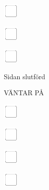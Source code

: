 \documentclass[11pt,titlepage]{article}
\begin{document}
\vspace{10mm}

\noindent
\includegraphics[]{checkbox-4mm.pdf}

\vspace{10mm}

\noindent
\includegraphics[]{checkbox-4mm.pdf}

\vspace{10mm}

\noindent
\includegraphics[]{checkbox-4mm.pdf}

\vspace{4mm}

\hfill Sidan slutförd \hspace{20mm}

\pagebreak

\small
\hfill VÄNTAR PÅ

\vspace{6mm}

\noindent
\includegraphics[]{checkbox-4mm.pdf}

\vspace{10mm}

\noindent
\includegraphics[]{checkbox-4mm.pdf}

\vspace{10mm}

\noindent
\includegraphics[]{checkbox-4mm.pdf}

\vspace{10mm}

\noindent
\includegraphics[]{checkbox-4mm.pdf}
\end{document}
